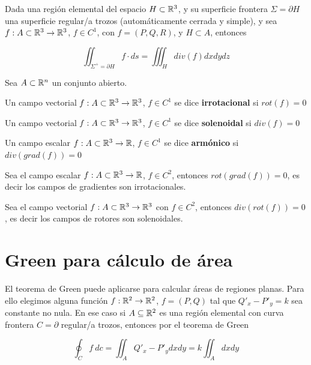 \begin{theorem} 
Dada una región elemental del espacio $H \subset \mathbb{R}^3$, y su superficie frontera $ \Sigma = \partial H$ una superficie regular/a trozos (automáticamente cerrada y simple), y sea $ f : A \subset \mathbb{R}^3 \to \mathbb{R}^3$, $f \in C^1$, con $ f = (P,Q,R)$, y $ H \subset A$, entonces

$$ \displaystyle \iint_{\Sigma^+ = \partial H} f \cdot ds = \iiint_H div(f) dxdydz $$
\end{theorem}

\begin{definition}
Sea $A \subset \mathbb{R}^n$ un conjunto abierto.

Un campo vectorial $f: A \subset \mathbb{R}^3 \to \mathbb{R}^3$, $ f \in C^1$ se dice \textbf{irrotacional}  si $ rot(f) = 0$

Un campo vectorial $f: A \subset \mathbb{R}^3 \to \mathbb{R}^3$, $ f \in C^1$ se dice \textbf{solenoidal}  si $ div(f) = 0$

Un campo escalar $ f: A \subset \mathbb{R}^3 \to \mathbb{R}$, $ f \in C^1$ se dice \textbf{armónico}  si $ div(grad(f)) = 0$
\end{definition}

\begin{theorem}
Sea el campo escalar $f: A \subset \mathbb{R}^3 \to \mathbb{R}$, $ f \in C^2$, entonces $ rot(grad(f)) = 0$, es decir los campos de gradientes son irrotacionales.

Sea el campo vectorial $f: A \subset \mathbb{R}^3 \to \mathbb{R}^3$ con $ f \in C^2$, entonces $div(rot(f)) = 0$, es decir los campos de rotores son solenoidales.
\end{theorem}


\section{Green para cálculo de área}

El teorema de Green puede aplicarse para calcular áreas de regiones planas.  Para ello elegimos alguna función $f : \mathbb{R}^2 \to \mathbb{R}^2$, $f = (P,Q)$ tal que $Q'_x - P'_y = k$ sea constante no nula.  En ese caso si $A \subseteq \mathbb{R}^2$ es una región elemental con curva frontera $C = \partial $ regular/a trozos, entonces por el teorema de Green

$$ \oint_C f \ dc = \iint_A Q'_x - P'_y dxdy = k \iint_A dxdy $$

